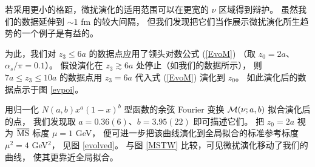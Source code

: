 若采用更小的格距，微扰演化的适用范围可以在更宽的 $\nu$ 区域得到辩护。
虽然我们的数据延伸到 $\sim 1$ fm 的较大间隔，
但我们发现把它们当作展示微扰演化所生趋势的一个例子是有益的。

为此，我们对 $z_3 \leq 6a$ 的数据点应用了领头对数公式 (\ref{EvoM})
（取 $z_0=2a$、$\alpha_s/\pi=0.1$）。
假设演化在 $z_3 \gtrsim 6a$ 处停止（如我们的数据所示），
则 \mbox{$7a \leq z_3 \leq 10a$} 的数据点用 $z_3=6a$ 代入式 (\ref{EvoM}) 演化到 $z_0$。
如此演化后的数据点示于图 \ref{evpoi}。


用归一化 $N(a,b) x^a(1-x)^b$ 型函数的余弦 Fourier 变换
${\cal M} (\nu;a,b)$ 拟合演化后的点，
我们发现取 $a = 0.36(6)$、$b=3.95(22)$ 即可描述它们。
把 $z_0=2a$ 视为 $\overline{\rm MS}$ 标度 $\mu=1$ GeV，
便可进一步把该曲线演化到全局拟合的标准参考标度 $\mu^2 = 4$ GeV$^2$，
见图 \ref{evolved}。
与图 \ref{MSTW} 比较，可见微扰演化移动了我们的曲线，
使其更靠近全局拟合。
